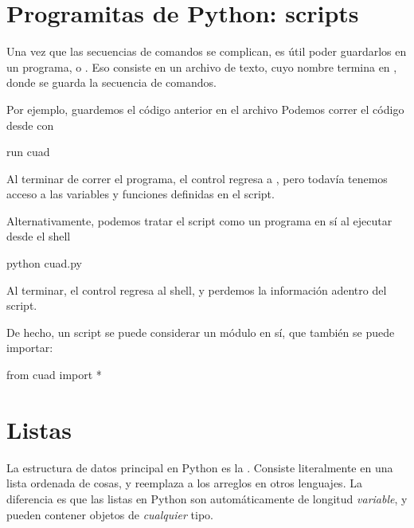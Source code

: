 \section{Programitas de Python: scripts}
Una vez que las secuencias de comandos se complican, es útil poder guardarlos en un programa, o .
Eso consiste en un archivo de texto, cuyo nombre termina en , donde se guarda la secuencia de comandos.

Por ejemplo, guardemos el código anterior en el archivo 
Podemos correr el código desde  con
\begin{python}
run cuad
\end{python}
Al terminar de correr el programa, el control regresa a , pero todavía tenemos acceso a las variables y funciones definidas en el script.

Alternativamente, podemos tratar el script como un programa en sí al ejecutar desde el shell
\begin{python}
python cuad.py
\end{python}
Al terminar, el control regresa al shell, y perdemos la información adentro del script.

De hecho, un script se puede considerar un módulo en sí, que también se puede importar:
\begin{python}
from cuad import *
\end{python}





\section{Listas}
La estructura de datos principal en Python es la . Consiste literalmente en una lista ordenada de cosas, y reemplaza a los arreglos en otros lenguajes. La diferencia es que las listas en Python son automáticamente de longitud \emph{variable}, y pueden contener objetos de \emph{cualquier} tipo.

